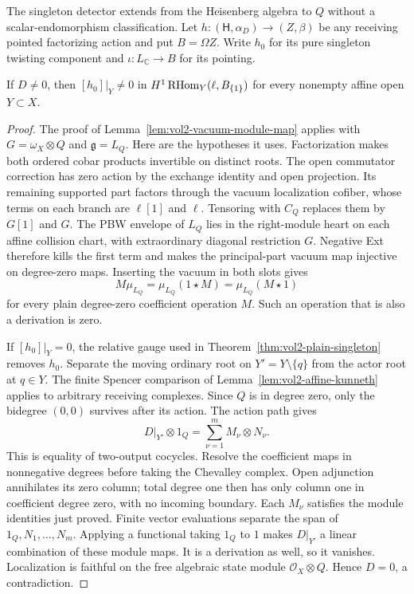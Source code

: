 The singleton detector extends from the Heisenberg algebra to
$Q$ without a scalar-endomorphism classification.
Let $h:(\mathsf H,\alpha_D)\to(Z,\beta)$ be any receiving
pointed factorizing action and put $B=\Omega Z$.
Write $h_0$ for its pure singleton twisting component and
$\iota:L_{\mathbb C}\to B$ for its pointing.

\begin{lemma}\label{lem:vol2-vertex-singleton}
If $D\ne0$, then $[h_0]|_Y\ne0$ in
$H^1\operatorname{RHom}_Y(\ell,B_{\{1\}})$ for every nonempty affine
open $Y\subset X$.
\end{lemma}
\begin{proof}
The proof of Lemma~\ref{lem:vol2-vacuum-module-map} applies
with $G=\omega_X\otimes Q$ and $\mathfrak g=L_Q$.
Here are the hypotheses it uses. Factorization makes both
ordered cobar products invertible on distinct roots. The open
commutator correction has zero action by the exchange identity
and open projection. Its remaining supported part factors
through the vacuum localization cofiber, whose terms on each
branch are $\ell[1]$ and $\ell$. Tensoring with $C_Q$ replaces
them by $G[1]$ and $G$. The PBW envelope of $L_Q$ lies in the
right-module heart on each affine collision chart, with
extraordinary diagonal restriction $G$. Negative Ext therefore
kills the first term and makes the principal-part vacuum map
injective on degree-zero maps. Inserting the vacuum in both
slots gives
\[
 M\mu_{L_Q}=\mu_{L_Q}(1\star M)=\mu_{L_Q}(M\star1)
\]
for every plain degree-zero coefficient operation $M$.
Such an operation that is also a derivation is zero.

If $[h_0]|_Y=0$, the relative gauge used in
Theorem~\ref{thm:vol2-plain-singleton} removes $h_0$.
Separate the moving ordinary root on $Y'=Y\setminus\{q\}$
from the actor root at $q\in Y$. The finite Spencer comparison
of Lemma~\ref{lem:vol2-affine-kunneth} applies to arbitrary
receiving complexes. Since $Q$ is in degree zero, only the
bidegree $(0,0)$ survives after its action. The action path gives
\[
 D|_{Y'}\otimes1_Q=\sum_{\nu=1}^m M_\nu\otimes N_\nu.
\]
This is equality of two-output cocycles. Resolve the coefficient
maps in nonnegative degrees before taking the Chevalley complex.
Open adjunction annihilates its zero column; total degree one
then has only column one in coefficient degree zero, with no
incoming boundary. Each $M_\nu$ satisfies the module
identities just proved. Finite vector evaluations separate the
span of $1_Q,N_1,\ldots,N_m$. Applying a functional taking
$1_Q$ to $1$ makes $D|_{Y'}$ a linear combination of these
module maps. It is a derivation as well, so it vanishes.
Localization is faithful on the free algebraic state module
$\mathcal O_X\otimes Q$. Hence $D=0$, a contradiction.
\end{proof}

